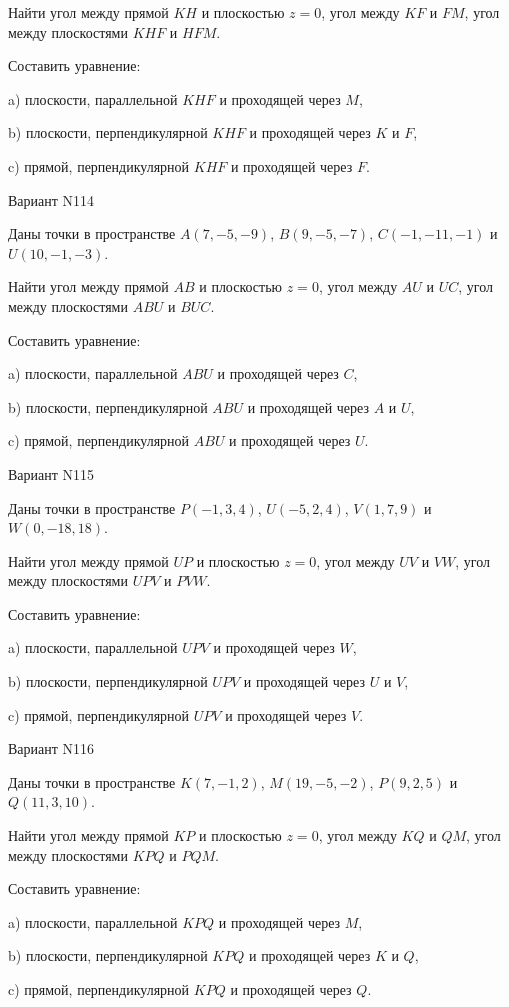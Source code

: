 \documentclass[11pt]{report}
\begin{document}
Найти угол между прямой $KH$ и плоскостью $z = 0$, угол между $KF$ и $FM$, угол между плоскостями $KHF$ 
и $HFM$.

Составить уравнение: 

a) плоскости, параллельной $KHF$ и проходящей через $M$,

b) плоскости, перпендикулярной $KHF$ и проходящей через $K$ и $F$,

c) прямой, перпендикулярной $KHF$ и проходящей через $F$.

Вариант N114

Даны точки в пространстве
$A(7, -5, -9)$, $B(9, -5, -7)$, $C(-1, -11, -1)$ и
$U(10, -1, -3)$.

Найти угол между прямой $AB$ и плоскостью $z = 0$, угол между $AU$ и $UC$, угол между плоскостями $ABU$ 
и $BUC$.

Составить уравнение: 

a) плоскости, параллельной $ABU$ и проходящей через $C$,

b) плоскости, перпендикулярной $ABU$ и проходящей через $A$ и $U$,

c) прямой, перпендикулярной $ABU$ и проходящей через $U$.

Вариант N115

Даны точки в пространстве
$P(-1, 3, 4)$, $U(-5, 2, 4)$, $V(1, 7, 9)$ и
$W(0, -18, 18)$.

Найти угол между прямой $UP$ и плоскостью $z = 0$, угол между $UV$ и $VW$, угол между плоскостями $UPV$ 
и $PVW$.

Составить уравнение: 

a) плоскости, параллельной $UPV$ и проходящей через $W$,

b) плоскости, перпендикулярной $UPV$ и проходящей через $U$ и $V$,

c) прямой, перпендикулярной $UPV$ и проходящей через $V$.

Вариант N116

Даны точки в пространстве
$K(7, -1, 2)$, $M(19, -5, -2)$, $P(9, 2, 5)$ и
$Q(11, 3, 10)$.

Найти угол между прямой $KP$ и плоскостью $z = 0$, угол между $KQ$ и $QM$, угол между плоскостями $KPQ$ 
и $PQM$.

Составить уравнение: 

a) плоскости, параллельной $KPQ$ и проходящей через $M$,

b) плоскости, перпендикулярной $KPQ$ и проходящей через $K$ и $Q$,

c) прямой, перпендикулярной $KPQ$ и проходящей через $Q$.
\end{document}
